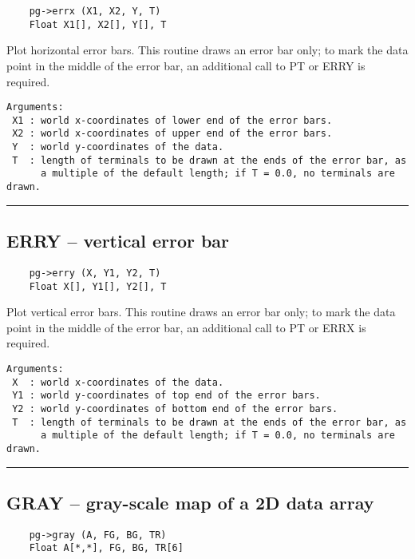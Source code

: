 \begin{verbatim}
    pg->errx (X1, X2, Y, T)
    Float X1[], X2[], Y[], T
\end{verbatim}

Plot horizontal error bars.  This routine draws an error bar only; to
mark the data point in the middle of the error bar, an additional call
to PT or ERRY is required.

\begin{verbatim}
Arguments:
 X1 : world x-coordinates of lower end of the error bars.
 X2 : world x-coordinates of upper end of the error bars.
 Y  : world y-coordinates of the data.
 T  : length of terminals to be drawn at the ends of the error bar, as
      a multiple of the default length; if T = 0.0, no terminals are drawn. 
\end{verbatim}

\hrule

\subsection*{ERRY -- vertical error bar }

\begin{verbatim}
    pg->erry (X, Y1, Y2, T)
    Float X[], Y1[], Y2[], T
\end{verbatim}

Plot vertical error bars.  This routine draws an error bar only; to
mark the data point in the middle of the error bar, an additional call
to PT or ERRX is required.

\begin{verbatim}
Arguments:
 X  : world x-coordinates of the data.
 Y1 : world y-coordinates of top end of the error bars.
 Y2 : world y-coordinates of bottom end of the error bars. 
 T  : length of terminals to be drawn at the ends of the error bar, as
      a multiple of the default length; if T = 0.0, no terminals are drawn. 
\end{verbatim}

\hrule

\subsection*{GRAY -- gray-scale map of a 2D data array }

\begin{verbatim}
    pg->gray (A, FG, BG, TR)
    Float A[*,*], FG, BG, TR[6]
\end{verbatim}

